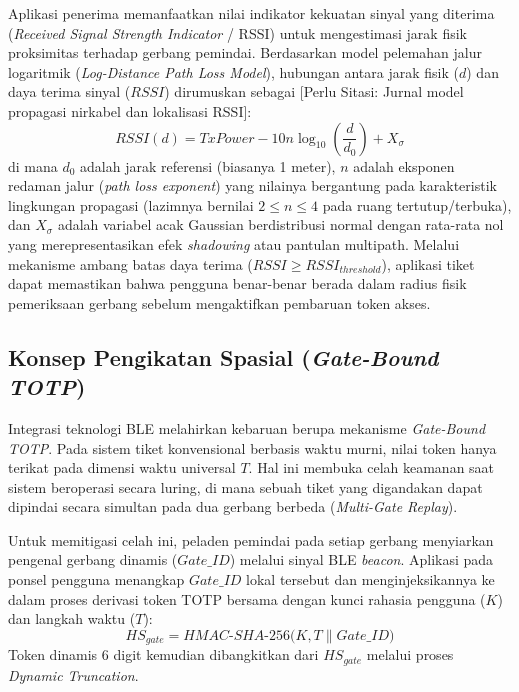 Aplikasi penerima memanfaatkan nilai indikator kekuatan sinyal yang diterima (\textit{Received Signal Strength Indicator} / RSSI) untuk mengestimasi jarak fisik proksimitas terhadap gerbang pemindai. Berdasarkan model pelemahan jalur logaritmik (\textit{Log-Distance Path Loss Model}), hubungan antara jarak fisik ($d$) dan daya terima sinyal ($RSSI$) dirumuskan sebagai [Perlu Sitasi: Jurnal model propagasi nirkabel dan lokalisasi RSSI]:
\begin{equation}
    RSSI(d) = TxPower - 10n \log_{10}\left(\frac{d}{d_0}\right) + X_\sigma
\end{equation}
di mana $d_0$ adalah jarak referensi (biasanya 1 meter), $n$ adalah eksponen redaman jalur (\textit{path loss exponent}) yang nilainya bergantung pada karakteristik lingkungan propagasi (lazimnya bernilai $2 \le n \le 4$ pada ruang tertutup/terbuka), dan $X_\sigma$ adalah variabel acak Gaussian berdistribusi normal dengan rata-rata nol yang merepresentasikan efek \textit{shadowing} atau pantulan multipath. Melalui mekanisme ambang batas daya terima ($RSSI \ge RSSI_{threshold}$), aplikasi tiket dapat memastikan bahwa pengguna benar-benar berada dalam radius fisik pemeriksaan gerbang sebelum mengaktifkan pembaruan token akses.

\subsection{Konsep Pengikatan Spasial (\textit{Gate-Bound TOTP})}
Integrasi teknologi BLE melahirkan kebaruan berupa mekanisme \textit{Gate-Bound TOTP}. Pada sistem tiket konvensional berbasis waktu murni, nilai token hanya terikat pada dimensi waktu universal $T$. Hal ini membuka celah keamanan saat sistem beroperasi secara luring, di mana sebuah tiket yang digandakan dapat dipindai secara simultan pada dua gerbang berbeda (\textit{Multi-Gate Replay}).

Untuk memitigasi celah ini, peladen pemindai pada setiap gerbang menyiarkan pengenal gerbang dinamis ($Gate\_ID$) melalui sinyal BLE \textit{beacon}. Aplikasi pada ponsel pengguna menangkap $Gate\_ID$ lokal tersebut dan menginjeksikannya ke dalam proses derivasi token TOTP bersama dengan kunci rahasia pengguna ($K$) dan langkah waktu ($T$):
\begin{equation}
    HS_{gate} = HMAC\text{-}SHA\text{-}256\Big(K, T \parallel Gate\_ID\Big)
\end{equation}
Token dinamis 6 digit kemudian dibangkitkan dari $HS_{gate}$ melalui proses \textit{Dynamic Truncation}.

